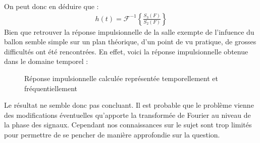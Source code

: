 On peut donc en déduire que :
\begin{eqnarray*}
h(t) = \mathcal{F}^{-1}\left\{ \frac{S_3 (F)}{S_2(F)}\right\} 
\end{eqnarray*}
Bien que retrouver la réponse impulsionnelle de la salle exempte de l'infuence du ballon semble simple sur un plan théorique, d'un point de vu pratique, de grosses difficultés ont été rencontrées. En effet, voici la réponse impulsionnelle obtenue dans le domaine temporel :
\begin{figure}[h!]
\caption{\label{bizarre}Réponse impulsionnelle calculée représentée temporellement et fréquentiellement}
\end{figure}
Le résultat ne semble donc pas concluant. Il est probable que le problème vienne des modifications éventuelles qu'apporte la transformée de Fourier au niveau de la phase des signaux. Cependant nos connaissances sur le sujet sont trop limités pour permettre de se pencher de manière approfondie sur la question.

